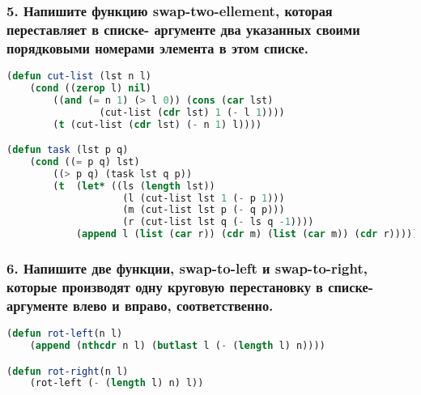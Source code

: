 \newpage
\subsubsection*{5. Напишите функцию swap-two-ellement, которая переставляет в списке- аргументе два указанных своими порядковыми номерами элемента в этом списке.}
\begin{lstlisting}[language=Lisp]
(defun cut-list (lst n l) 
	(cond ((zerop l) nil)
		((and (= n 1) (> l 0)) (cons (car lst) 
				(cut-list (cdr lst) 1 (- l 1))))
		(t (cut-list (cdr lst) (- n 1) l))))

(defun task (lst p q)
	(cond ((= p q) lst)
		((> p q) (task lst q p))
		(t  (let* ((ls (length lst))
					(l (cut-list lst 1 (- p 1)))
					(m (cut-list lst p (- q p)))
					(r (cut-list lst q (- ls q -1))))
			(append l (list (car r)) (cdr m) (list (car m)) (cdr r))))))

\end{lstlisting}

\subsubsection*{6. Напишите две функции, swap-to-left и swap-to-right, которые производят одну круговую перестановку в списке-аргументе влево и вправо, соответственно.}





\begin{lstlisting}[language=Lisp]
(defun rot-left(n l)
	(append (nthcdr n l) (butlast l (- (length l) n))))

(defun rot-right(n l)
	(rot-left (- (length l) n) l))

\end{lstlisting}


\newpage
